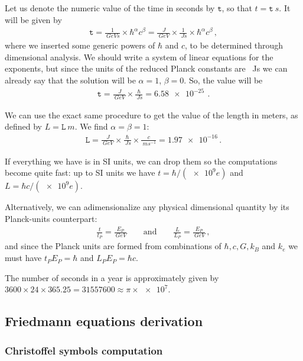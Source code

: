\documentclass[main.tex]{subfiles}
\begin{document}
Let us denote the numeric value of the time in seconds by \(\mathtt{t}\), so that \(t = \mathtt{t} \SI{}{s}\). It will be given by 
%
\begin{align}
\mathtt{t} = \frac{1}{\SI{}{GeV s}} \times \hbar^{\alpha } c^{\beta } = \frac{\SI{}{J}}{\SI{}{GeV}} \times \frac{1}{\SI{}{Js}} \times \hbar^{\alpha } c^{\beta }  
\,,
\end{align}
%
where we inserted some generic powers of \(\hbar\) and \(c\), to be determined through dimensional analysis.
We should write a system of linear equations for the exponents, but since the units of the reduced Planck constants are \SI{}{Js} we can already say that the solution will be \(\alpha = 1\), \(\beta =0\). 
So, the value will be 
%
\begin{align}
\mathtt{t}  = \frac{\SI{}{J}}{\SI{}{GeV}} \times \frac{\hbar}{\SI{}{Js}} = \SI{6.58e-25}{}
\,.
\end{align}

We can use the exact same procedure to get the value of the length in meters, as defined by \(L = \mathtt{L} \SI{}{m}\). We find \(\alpha = \beta = 1\): 
%
\begin{align}
\mathtt{L} = \frac{\SI{}{J}}{\SI{}{GeV}} 
\times \frac{\hbar}{\SI{}{Js}} \times \frac{c }{\SI{}{m s^{-1}}} = \num{1.97e-16}
\,.
\end{align}

If everything we have is in SI units, we can drop them so the computations become quite fast: up to SI units we have \(t  = \hbar / (\num{e9}e) \) and \(L = \hbar c / (\num{e9} e)\).

Alternatively, we can adimensionalize any physical dimensional quantity by its Planck-units counterpart: 
%
\begin{align}
\frac{t}{t_P} = \frac{E_P}{\SI{}{GeV}} \qquad \text{and} \qquad \frac{L}{L_P} = \frac{E_P}{\SI{}{GeV}}
\,,
\end{align}
%
and since the Planck units are formed from combinations of \(\hbar, c, G, k_B\) and \(k_e\) we must have \(t_P E_P = \hbar\) and \(L_P E_P = \hbar c\). 

The number of seconds in a year is approximately given by \(3600 \times 24 \times 365.25 = 31557600 \approx \pi \times \num{e7}\).

\subsection{Friedmann equations derivation}

\subsubsection{Christoffel symbols computation}
\end{document}
